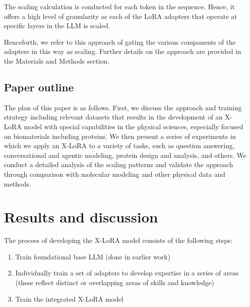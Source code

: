 The scaling calculation is conducted for each token in the sequence. Hence, it offers a high level of granularity as each of the LoRA adapters that operate at specific layers in the LLM is scaled. 

Henceforth, we refer to this approach of gating the various components of the adapters in this way as scaling. Further details on the approach are provided in the Materials and Methods section.

\subsection{Paper outline}

The plan of this paper is as follows. First, we discuss the approach and training strategy including relevant datasets that results in the development of an X-LoRA model with special capabilities in the physical sciences, especially focused on biomaterials including proteins. We then present a series of experiments in which we apply an X-LoRA to a variety of tasks, such as question answering, conversational and agentic modeling, protein design and analysis, and others. We conduct a detailed analysis of the scaling patterns and validate the approach through comparison with molecular modeling and other physical data and methods. 

\section{Results and discussion}

The process of developing the X-LoRA model consists of the following steps:
\begin{enumerate}
    \item Train foundational base LLM (done in earlier work)
    \item Individually train a set of adapters to develop expertise in a series of areas (these reflect distinct or overlapping areas of skills and knowledge)
    \item Train the integrated X-LoRA model
\end{enumerate}


